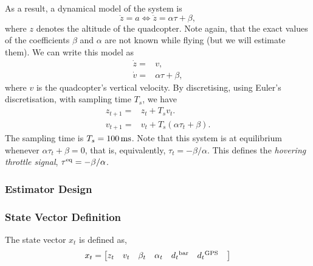 \documentclass{article}
\begin{document}
  As a result, a dynamical model of the system is
  \begin{equation}
    \ddot{z} {}={} a \Leftrightarrow \ddot{z} {}={} \alpha \tau + \beta,
  \end{equation}
  where $z$ denotes the altitude of the quadcopter.
  Note again, that the exact values of the coefficients $\beta$ and $\alpha$ are not known
  while flying (but we will estimate them). We can write this model as
  \begin{subequations}
    \begin{align}
      \dot{z} {}={} & v,
      \\
      \dot{v} {}={} & \alpha \tau + \beta,
    \end{align}
  \end{subequations}
  where $v$ is the quadcopter's vertical velocity.
  By discretising, using Euler's discretisation, with sampling time $T_s$,
  we have
  \begin{subequations}\label{eq:basic-mdl}
    \begin{align}
      z_{t+1} {}={} & z_t + T_s v_t.
      \\
      v_{t+1} {}={} & v_t + T_s(\alpha \tau_t + \beta).
    \end{align}
  \end{subequations}
  The sampling time is $T_s = \unit[100]{ms}$.
  Note that this system is at equilibrium whenever $\alpha \tau_t + \beta = 0$,
  that is, equivalently, $\tau_t = -\beta / \alpha$. This defines the \textit{hovering
    throttle signal}, $\tau^{\rm eq} = -\beta / \alpha$.


    \subsubsection*{Estimator Design}\label{estimator_design}
    \subsubsection*{State Vector Definition}
    The state vector \( x_t \) is defined as,
    \begin{equation}
        x_t = 
        \begin{bmatrix}
            z_t &
            v_{t} & 
            \beta_t & 
            \alpha_t &
            d{_t}^{\rm bar}&
            d{_t}^{\rm GPS}&
        \end{bmatrix}
        \label{stateVectorXt}
    \end{equation}
\end{document}
